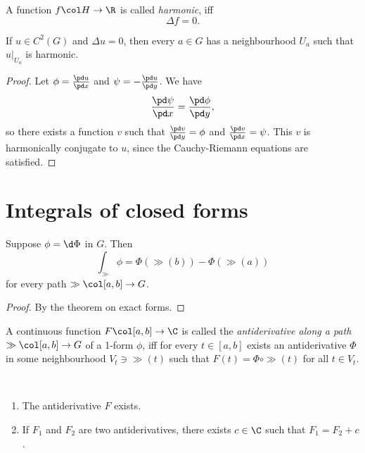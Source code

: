 \begin{definition}
  A function $f \col H \to \R$ is called \emph{harmonic}, iff
  $$ \Delta f = 0. $$
\end{definition}

\begin{theorem}
  If $u \in C^2(G)$ and $\Delta u = 0$, then every $a \in G$ has a neighbourhood $U_a$ such that $u|_{U_a}$ is harmonic.
\end{theorem}

\begin{proof}
  Let $\phi = \frac{\pd u}{\pd x}$ and $\psi = -\frac{\pd u}{\pd y}$. We have
  $$ \frac{\pd \psi}{\pd x} = \frac{\pd \phi}{\pd y}, $$
  so there exists a function $v$ such that $\frac{\pd v}{\pd y} = \phi$ and $\frac{\pd v}{\pd x} = \psi$. This $v$ is harmonically conjugate to $u$, since the Cauchy-Riemann equations are satisfied.
\end{proof}


\section{Integrals of closed forms}

\begin{lemma}
  Suppose $\phi = \d \Phi$ in $G$. Then
  $$ \int_\gg \phi = \Phi(\gg(b)) - \Phi(\gg(a)) $$
  for every path $\gg \col [a, b] \to G$.
\end{lemma}

\begin{proof}
  By the theorem on exact forms.
\end{proof}

\begin{definition}
  A continuous function $F \col [a, b] \to \C$ is called the \emph{antiderivative along a path} $\gg \col [a, b] \to G$ of a 1-form $\phi$, iff for every $t \in [a, b]$ exists an antiderivative $\Phi$ in some neighbourhood $V_t \ni \gg(t)$ such that $F(t) = \Phi \circ \gg(t)$ for all $t \in V_t$.
\end{definition}

\begin{theorem}
  ~\begin{enumerate}
    \item The antiderivative $F$ exists.
    \item If $F_1$ and $F_2$ are two antiderivatives, there exists $c \in \C$ such that $F_1 = F_2 + c$.
  \end{enumerate}  
\end{theorem}


